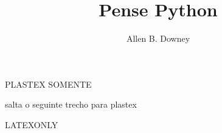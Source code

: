 \documentclass[10pt]{book}
\title{Pense Python}
\author{Allen B. Downey}
\newif\ifplastex
\begin{document}
\frontmatter

PLASTEX SOMENTE
\ifplastex
    \usepackage{localdef}
    \maketitle

\newcount\anchorcnt
\newcommand*{\Anchor}[1]{%
  \@bsphack%
    \Hy@GlobalStepCount\anchorcnt%
    \edef\@currentHref{anchor.\the\anchorcnt}
    \Hy@raisedlink{\hyper@anchorstart{\@currentHref}\hyper@anchorend}
    \M@gettitle{}\label{#1}
    \@esphack%
}


\else
salta o seguinte trecho para plastex

\newtheorem{exercise}{Exercise}[chapter]

LATEXONLY


\end{document}
